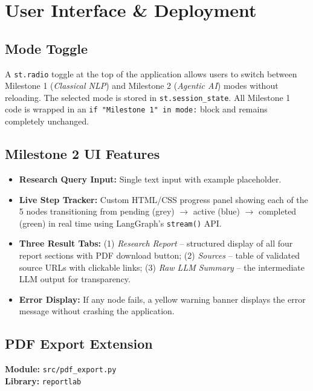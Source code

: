\documentclass[12pt, a4paper]{article}
\begin{document}
\section{User Interface \& Deployment}

\subsection{Mode Toggle}
A \texttt{st.radio} toggle at the top of the application allows users to switch between Milestone 1 (\textit{Classical NLP}) and Milestone 2 (\textit{Agentic AI}) modes without reloading. The selected mode is stored in \texttt{st.session\_state}. All Milestone 1 code is wrapped in an \texttt{if "Milestone 1" in mode:} block and remains completely unchanged.

\subsection{Milestone 2 UI Features}
\begin{itemize}
  \item \textbf{Research Query Input:} Single text input with example placeholder.
  \item \textbf{Live Step Tracker:} Custom HTML/CSS progress panel showing each of the 5 nodes transitioning from pending (grey) $\to$ active (blue) $\to$ completed (green) in real time using LangGraph's \texttt{stream()} API.
  \item \textbf{Three Result Tabs:} (1) \textit{Research Report} -- structured display of all four report sections with PDF download button; (2) \textit{Sources} -- table of validated source URLs with clickable links; (3) \textit{Raw LLM Summary} -- the intermediate LLM output for transparency.
  \item \textbf{Error Display:} If any node fails, a yellow warning banner displays the error message without crashing the application.
\end{itemize}

\subsection{PDF Export Extension}

\textbf{Module:} \texttt{src/pdf\_export.py} \\
\textbf{Library:} \texttt{reportlab}
\end{document}
